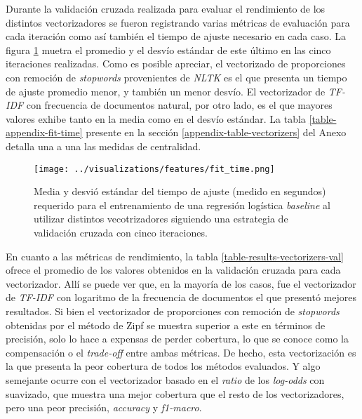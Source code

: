 Durante la validaci\'on cruzada realizada para evaluar el rendimiento de los
distintos vectorizadores se fueron registrando varias m\'etricas de evaluaci\'on
para cada iteraci\'on como as\'i tambi\'en el tiempo de ajuste necesario en cada caso.
La figura \ref{fig-results-features-fit-time} muetra el promedio y el desv\'io
est\'andar de este \'ultimo en las cinco iteraciones realizadas. Como es posible
apreciar, el vectorizado de proporciones con remoci\'on de \textit{stopwords}
provenientes de \textit{NLTK} es el que presenta un tiempo de ajuste promedio
menor, y tambi\'en un menor desv\'io. El vectorizador de \textit{TF-IDF} con
frecuencia de documentos natural, por otro lado, es el que mayores valores
exhibe tanto en la media como en el desv\'io est\'andar. La tabla \ref{table-appendix-fit-time}
presente en la secci\'on \ref{appendix-table-vectorizers} del Anexo detalla una
a una las medidas de centralidad.

\begin{figure}[h!]
    \centering
    \texttt{[image: ../visualizations/features/fit\_time.png]}
    \caption{Media y desvi\'o est\'andar del tiempo de ajuste (medido en segundos)
    requerido para el entrenamiento de una regresi\'on log\'istica \textit{baseline}
    al utilizar distintos vecotrizadores siguiendo una estrategia de
    validaci\'on cruzada con cinco iteraciones.}
    \label{fig-results-features-fit-time}
\end{figure}

En cuanto a las m\'etricas de rendimiento,
la tabla \ref{table-results-vectorizers-val} ofrece el promedio de los valores
obtenidos en la validaci\'on cruzada para cada vectorizador. All\'i se puede ver que,
en la mayor\'ia de los casos, fue el vectorizador de \textit{TF-IDF} con logaritmo
de la frecuencia de documentos el que present\'o mejores resultados. Si bien el
vectorizador de proporciones con remoci\'on de \textit{stopwords} obtenidas por el
m\'etodo de Zipf se muestra superior a este en t\'erminos de precisi\'on, solo
lo hace a expensas de perder cobertura, lo que se conoce como la compensaci\'on o el
\textit{trade-off} entre ambas m\'etricas. De hecho, esta vectorizaci\'on es la que
presenta la peor cobertura de todos los m\'etodos evaluados. Y algo semejante ocurre
con el vectorizador basado en el \textit{ratio} de los \textit{log-odds} con
suavizado, que
muestra una mejor cobertura que el resto de los vectorizadores, pero una peor
precisi\'on, \textit{accuracy} y \textit{f1-macro}.

